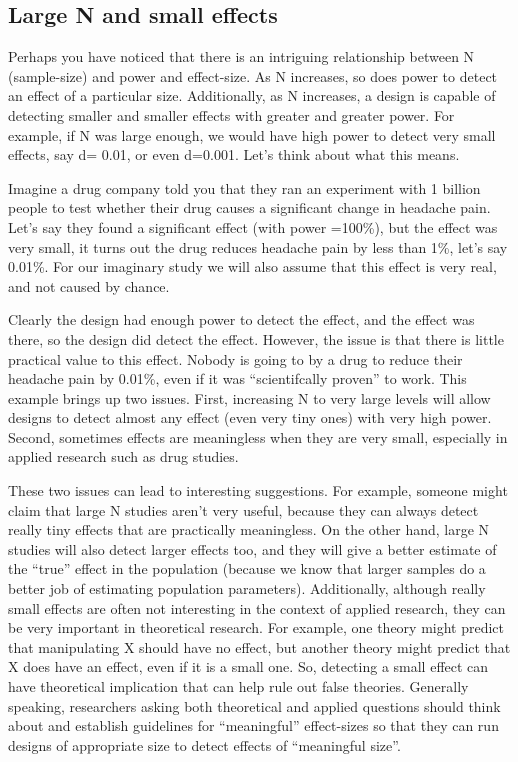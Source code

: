 \documentclass[
  letterpaper,
  DIV=11,
  numbers=noendperiod]{scrreprt}
\begin{document}
\subsection{Large N and small effects}\label{large-n-and-small-effects}

Perhaps you have noticed that there is an intriguing relationship
between N (sample-size) and power and effect-size. As N increases, so
does power to detect an effect of a particular size. Additionally, as N
increases, a design is capable of detecting smaller and smaller effects
with greater and greater power. For example, if N was large enough, we
would have high power to detect very small effects, say d= 0.01, or even
d=0.001. Let's think about what this means.

Imagine a drug company told you that they ran an experiment with 1
billion people to test whether their drug causes a significant change in
headache pain. Let's say they found a significant effect (with power
=100\%), but the effect was very small, it turns out the drug reduces
headache pain by less than 1\%, let's say 0.01\%. For our imaginary
study we will also assume that this effect is very real, and not caused
by chance.

Clearly the design had enough power to detect the effect, and the effect
was there, so the design did detect the effect. However, the issue is
that there is little practical value to this effect. Nobody is going to
by a drug to reduce their headache pain by 0.01\%, even if it was
``scientifcally proven'' to work. This example brings up two issues.
First, increasing N to very large levels will allow designs to detect
almost any effect (even very tiny ones) with very high power. Second,
sometimes effects are meaningless when they are very small, especially
in applied research such as drug studies.

These two issues can lead to interesting suggestions. For example,
someone might claim that large N studies aren't very useful, because
they can always detect really tiny effects that are practically
meaningless. On the other hand, large N studies will also detect larger
effects too, and they will give a better estimate of the ``true'' effect
in the population (because we know that larger samples do a better job
of estimating population parameters). Additionally, although really
small effects are often not interesting in the context of applied
research, they can be very important in theoretical research. For
example, one theory might predict that manipulating X should have no
effect, but another theory might predict that X does have an effect,
even if it is a small one. So, detecting a small effect can have
theoretical implication that can help rule out false theories. Generally
speaking, researchers asking both theoretical and applied questions
should think about and establish guidelines for ``meaningful''
effect-sizes so that they can run designs of appropriate size to detect
effects of ``meaningful size''.
\end{document}
